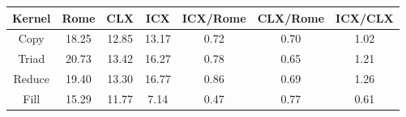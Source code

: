 \begin{tabular}{|c|c|c|c|c|c|c|}  \hline
Kernel&Rome&CLX&ICX & ICX/Rome & CLX/Rome & ICX/CLX \\ \hline 
Copy & 18.25 & 12.85 & 13.17  & 0.72 & 0.70 & 1.02 \\ \hline 
Triad & 20.73 & 13.42 & 16.27  & 0.78 & 0.65 & 1.21 \\ \hline 
Reduce & 19.40 & 13.30 & 16.77  & 0.86 & 0.69 & 1.26 \\ \hline 
Fill & 15.29 & 11.77 & 7.14  & 0.47 & 0.77 & 0.61 \\ \hline 
\end{tabular}

